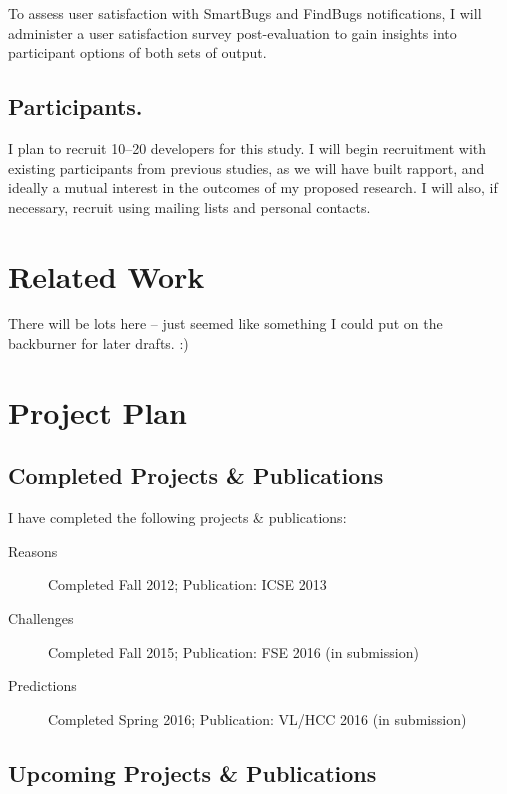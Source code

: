 \documentclass{llncs}
\begin{document}
To assess user satisfaction with SmartBugs and FindBugs notifications, I will administer a user satisfaction survey post-evaluation to gain insights into participant options of both sets of output.


\subsection{Participants.} I plan to recruit 10--20 developers for this study. I will begin recruitment with existing participants from previous studies, as we will have built rapport, and ideally a mutual interest in the outcomes of my proposed research. I will also, if necessary, recruit using mailing lists and personal contacts.



\section{Related Work}

There will be lots here -- just seemed like something I could put on the backburner for later drafts. :)

\section{Project Plan}

\subsection{Completed Projects \& Publications}

I have completed the following projects \& publications:
\begin{description}
	\item[Reasons] Completed Fall 2012; Publication: ICSE 2013
	\item[Challenges] Completed Fall 2015; Publication: FSE 2016 (in submission)
	\item[Predictions] Completed Spring 2016; Publication: VL/HCC 2016 (in submission)
\end{description}

\subsection{Upcoming Projects \& Publications}
\end{document}
